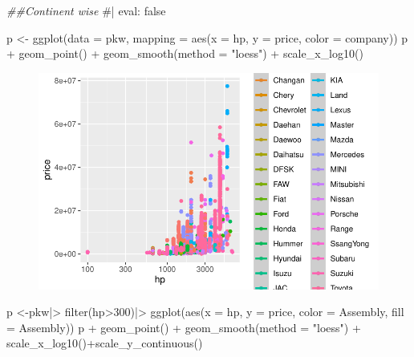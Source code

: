 \documentclass[
  letterpaper,
  DIV=11,
  numbers=noendperiod]{scrartcl}
\newenvironment{Shaded}{\begin{snugshade}}{\end{snugshade}}
\newcommand{\AttributeTok}[1]{\textcolor[rgb]{0.40,0.45,0.13}{#1}}
\newcommand{\CommentTok}[1]{\textcolor[rgb]{0.37,0.37,0.37}{#1}}
\newcommand{\DecValTok}[1]{\textcolor[rgb]{0.68,0.00,0.00}{#1}}
\newcommand{\DocumentationTok}[1]{\textcolor[rgb]{0.37,0.37,0.37}{\textit{#1}}}
\newcommand{\FunctionTok}[1]{\textcolor[rgb]{0.28,0.35,0.67}{#1}}
\newcommand{\NormalTok}[1]{\textcolor[rgb]{0.00,0.23,0.31}{#1}}
\newcommand{\OtherTok}[1]{\textcolor[rgb]{0.00,0.23,0.31}{#1}}
\newcommand{\SpecialCharTok}[1]{\textcolor[rgb]{0.37,0.37,0.37}{#1}}
\newcommand{\StringTok}[1]{\textcolor[rgb]{0.13,0.47,0.30}{#1}}
\begin{document}
\begin{Shaded}
\begin{Highlighting}[]
\DocumentationTok{\#\#Continent wise}
\CommentTok{\#| eval: false}

\NormalTok{p }\OtherTok{\textless{}{-}} \FunctionTok{ggplot}\NormalTok{(}\AttributeTok{data =}\NormalTok{ pkw,}
            \AttributeTok{mapping =} \FunctionTok{aes}\NormalTok{(}\AttributeTok{x =}\NormalTok{ hp,}
                          \AttributeTok{y =}\NormalTok{ price,}
                          \AttributeTok{color =}\NormalTok{ company))}
\NormalTok{p }\SpecialCharTok{+} \FunctionTok{geom\_point}\NormalTok{() }\SpecialCharTok{+}
  \FunctionTok{geom\_smooth}\NormalTok{(}\AttributeTok{method =} \StringTok{"loess"}\NormalTok{) }\SpecialCharTok{+}
  \FunctionTok{scale\_x\_log10}\NormalTok{()}
\end{Highlighting}
\end{Shaded}

\begin{figure}[H]

{\centering \includegraphics[width=17.1875in,height=\textheight]{pakwheels_files/figure-pdf/unnamed-chunk-33-1.pdf}

}

\end{figure}

\begin{Shaded}
\begin{Highlighting}[]
\NormalTok{p }\OtherTok{\textless{}{-}}\NormalTok{pkw}\SpecialCharTok{|\textgreater{}} \FunctionTok{filter}\NormalTok{(hp}\SpecialCharTok{\textgreater{}}\DecValTok{300}\NormalTok{)}\SpecialCharTok{|\textgreater{}} \FunctionTok{ggplot}\NormalTok{(}\FunctionTok{aes}\NormalTok{(}\AttributeTok{x =}\NormalTok{ hp,}
                          \AttributeTok{y =}\NormalTok{ price,}
                          \AttributeTok{color =}\NormalTok{ Assembly,}
                          \AttributeTok{fill =}\NormalTok{ Assembly))}
\NormalTok{p }\SpecialCharTok{+} \FunctionTok{geom\_point}\NormalTok{() }\SpecialCharTok{+}
  \FunctionTok{geom\_smooth}\NormalTok{(}\AttributeTok{method =} \StringTok{"loess"}\NormalTok{) }\SpecialCharTok{+}
  \FunctionTok{scale\_x\_log10}\NormalTok{()}\SpecialCharTok{+}\FunctionTok{scale\_y\_continuous}\NormalTok{()}
\end{Highlighting}
\end{Shaded}
\end{document}
